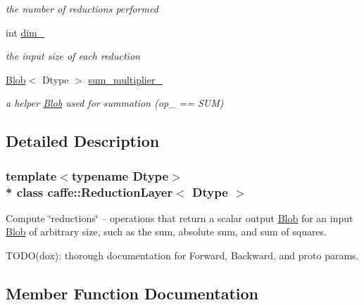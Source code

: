 \begin{DoxyCompactItemize}
\begin{DoxyCompactList}\small\item\em the number of reductions performed \end{DoxyCompactList}\item 
int \hyperlink{classcaffe_1_1ReductionLayer_a5d0cdd8ca00e6bbd425a51bef2214a7e}{dim\+\_\+}\hypertarget{classcaffe_1_1ReductionLayer_a5d0cdd8ca00e6bbd425a51bef2214a7e}{}\label{classcaffe_1_1ReductionLayer_a5d0cdd8ca00e6bbd425a51bef2214a7e}

\begin{DoxyCompactList}\small\item\em the input size of each reduction \end{DoxyCompactList}\item 
\hyperlink{classcaffe_1_1Blob}{Blob}$<$ Dtype $>$ \hyperlink{classcaffe_1_1ReductionLayer_a141288e2904ab45831a6af704561b473}{sum\+\_\+multiplier\+\_\+}\hypertarget{classcaffe_1_1ReductionLayer_a141288e2904ab45831a6af704561b473}{}\label{classcaffe_1_1ReductionLayer_a141288e2904ab45831a6af704561b473}

\begin{DoxyCompactList}\small\item\em a helper \hyperlink{classcaffe_1_1Blob}{Blob} used for summation (op\+\_\+ == S\+UM) \end{DoxyCompactList}\end{DoxyCompactItemize}


\subsection{Detailed Description}
\subsubsection*{template$<$typename Dtype$>$\\*
class caffe\+::\+Reduction\+Layer$<$ Dtype $>$}

Compute \char`\"{}reductions\char`\"{} -- operations that return a scalar output \hyperlink{classcaffe_1_1Blob}{Blob} for an input \hyperlink{classcaffe_1_1Blob}{Blob} of arbitrary size, such as the sum, absolute sum, and sum of squares. 

T\+O\+D\+O(dox)\+: thorough documentation for Forward, Backward, and proto params. 

\subsection{Member Function Documentation}
